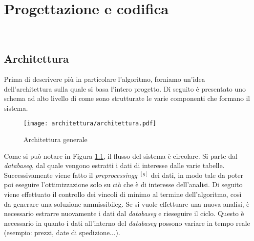 
\chapter{Progettazione e codifica}
\label{cap:progettazione-codifica}

\noindent {}\\

\section{Architettura}
\label{sec:progettazione}
\noindent Prima di descrivere più in particolare l'algoritmo, forniamo un’idea dell’architettura sulla quale si basa l'intero progetto.
Di seguito è presentato uno schema ad alto livello di come sono strutturate le varie
componenti che formano il sistema.

\begin{figure}[!h] 
    \centering 
    \texttt{[image: architettura/architettura.pdf]} 
    \caption{Architettura generale}
    \label{architettura-generale}
\end{figure}

\noindent Come si può notare in Figura \ref{architettura-generale},
il flusso del sistema è circolare.
Si parte dal \textit{\gls{databaseg}}, dal quale vengono estratti i dati di interesse dalle varie
tabelle. Successivamente viene fatto il \textit{\gls{preprocessingg}} $^{[g]}$ dei dati,
in modo tale da poter poi eseguire l'ottimizzazione solo su
ciò che è di interesse dell'analisi.
Di seguito viene effettuato il controllo dei vincoli di minimo al termine
dell'algoritmo, così da generare
una soluzione \gls{ammissibileg}. Se si vuole effettuare una nuova
analisi, è necessario estrarre nuovamente i dati dal
\textit{\gls{databaseg}} e rieseguire il ciclo. Questo è necessario
in quanto i dati all'interno del \textit{\gls{databaseg}} possono variare in tempo reale
(esempio: prezzi, date di spedizione...).

\newpage



